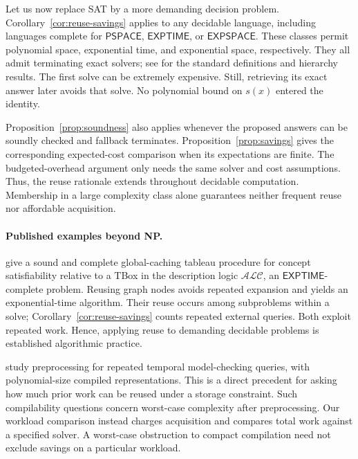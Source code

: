 \documentclass[11pt,a4paper]{article}
\numberwithin{equation}{section}
\theoremstyle{plain}
\theoremstyle{definition}
\theoremstyle{remark}
\begin{document}
Let us now replace SAT by a more demanding decision problem. Corollary~\ref{cor:reuse-savings} applies to any decidable language, including languages complete for $\mathsf{PSPACE}$, $\mathsf{EXPTIME}$, or $\mathsf{EXPSPACE}$. These classes permit polynomial space, exponential time, and exponential space, respectively. They all admit terminating exact solvers; see \citet{sipser2020theory} for the standard definitions and hierarchy results. The first solve can be extremely expensive. Still, retrieving its exact answer later avoids that solve. No polynomial bound on $s(x)$ entered the identity.

Proposition~\ref{prop:soundness} also applies whenever the proposed answers can be soundly checked and fallback terminates. Proposition~\ref{prop:savings} gives the corresponding expected-cost comparison when its expectations are finite. The budgeted-overhead argument only needs the same solver and cost assumptions. Thus, the reuse rationale extends throughout decidable computation. Membership in a large complexity class alone guarantees neither frequent reuse nor affordable acquisition.

\paragraph{Published examples beyond NP.}
\citet{gore2013caching} give a sound and complete global-caching tableau procedure for concept satisfiability relative to a TBox in the description logic $\mathcal{ALC}$, an $\mathsf{EXPTIME}$-complete problem. Reusing graph nodes avoids repeated expansion and yields an exponential-time algorithm. Their reuse occurs among subproblems within a solve; Corollary~\ref{cor:reuse-savings} counts repeated external queries. Both exploit repeated work. Hence, applying reuse to demanding decidable problems is established algorithmic practice.

\citet{ferrara2007preprocessing} study preprocessing for repeated temporal model-checking queries, with polynomial-size compiled representations. This is a direct precedent for asking how much prior work can be reused under a storage constraint. Such compilability questions concern worst-case complexity after preprocessing. Our workload comparison instead charges acquisition and compares total work against a specified solver. A worst-case obstruction to compact compilation need not exclude savings on a particular workload.
\end{document}
